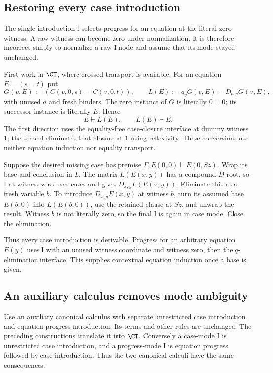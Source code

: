 \subsection{Restoring every case introduction}

The single introduction I selects progress for an equation at the literal
zero witness. A raw witness can become zero under normalization.
It is therefore incorrect simply to normalize a raw I node and assume that
its mode stayed unchanged.

First work in $\CT$, where crossed transport is available. For an equation
$E=(s=t)$ put
\[
 G(v,E):=(C(v,0,s)=C(v,0,t)),\qquad
 L(E):=q_vG(v,E)=D_{a,v}G(v,E),
\]
with unused $a$ and fresh binders. The zero instance of $G$ is literally
$0=0$; its successor instance is literally $E$. Hence
\[
 E\vdash L(E),\qquad L(E)\vdash E.
\]
The first direction uses the equality-free case-closure interface at dummy
witness $1$; the second eliminates that closure at $1$ using reflexivity.
These conversions use neither equation induction nor equality transport.

Suppose the desired missing case has premise
$\Gamma,E(0,0)\vdash E(0,Sz)$. Wrap its base and conclusion in $L$.
The matrix $L(E(x,y))$ has a compound $D$ root, so I at witness zero uses
cases and gives $D_{x,y}L(E(x,y))$. Eliminate this at a fresh variable $b$.
To introduce $D_{x,y}E(x,y)$ at witness $b$, turn its assumed base
$E(b,0)$ into $L(E(b,0))$, use the retained clause at $Sz$, and unwrap
the result. Witness $b$ is not literally zero, so the final I is again
in case mode. Close the elimination.

Thus every case introduction is derivable. Progress for an arbitrary
equation $E(y)$ uses I with an unused witness coordinate and witness zero,
then the $q$-elimination interface. This supplies contextual equation
induction once a base is given.

\subsection{An auxiliary calculus removes mode ambiguity}

Use an auxiliary canonical calculus with separate unrestricted case
introduction and equation-progress introduction. Its terms and other
rules are unchanged. The preceding constructions translate it into
$\CT$. Conversely a case-mode I is unrestricted case introduction, and
a progress-mode I is equation progress followed by case introduction.
Thus the two canonical calculi have the same consequences.

